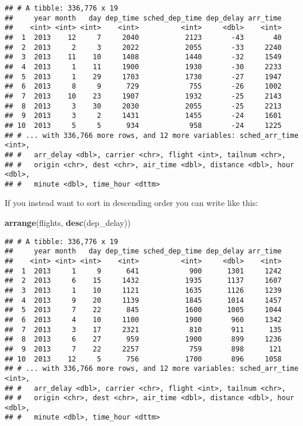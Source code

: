 \documentclass[]{book}
\newenvironment{Shaded}{\begin{snugshade}}{\end{snugshade}}
\newcommand{\KeywordTok}[1]{\textcolor[rgb]{0.13,0.29,0.53}{\textbf{#1}}}
\newcommand{\NormalTok}[1]{#1}
\begin{document}
\begin{verbatim}
## # A tibble: 336,776 x 19
##     year month   day dep_time sched_dep_time dep_delay arr_time
##    <int> <int> <int>    <int>          <int>     <dbl>    <int>
##  1  2013    12     7     2040           2123       -43       40
##  2  2013     2     3     2022           2055       -33     2240
##  3  2013    11    10     1408           1440       -32     1549
##  4  2013     1    11     1900           1930       -30     2233
##  5  2013     1    29     1703           1730       -27     1947
##  6  2013     8     9      729            755       -26     1002
##  7  2013    10    23     1907           1932       -25     2143
##  8  2013     3    30     2030           2055       -25     2213
##  9  2013     3     2     1431           1455       -24     1601
## 10  2013     5     5      934            958       -24     1225
## # ... with 336,766 more rows, and 12 more variables: sched_arr_time <int>,
## #   arr_delay <dbl>, carrier <chr>, flight <int>, tailnum <chr>,
## #   origin <chr>, dest <chr>, air_time <dbl>, distance <dbl>, hour <dbl>,
## #   minute <dbl>, time_hour <dttm>
\end{verbatim}

If you instead want to sort in descending order you can write like this:

\begin{Shaded}
\begin{Highlighting}[]
\KeywordTok{arrange}\NormalTok{(flights, }\KeywordTok{desc}\NormalTok{(dep_delay))}
\end{Highlighting}
\end{Shaded}

\begin{verbatim}
## # A tibble: 336,776 x 19
##     year month   day dep_time sched_dep_time dep_delay arr_time
##    <int> <int> <int>    <int>          <int>     <dbl>    <int>
##  1  2013     1     9      641            900      1301     1242
##  2  2013     6    15     1432           1935      1137     1607
##  3  2013     1    10     1121           1635      1126     1239
##  4  2013     9    20     1139           1845      1014     1457
##  5  2013     7    22      845           1600      1005     1044
##  6  2013     4    10     1100           1900       960     1342
##  7  2013     3    17     2321            810       911      135
##  8  2013     6    27      959           1900       899     1236
##  9  2013     7    22     2257            759       898      121
## 10  2013    12     5      756           1700       896     1058
## # ... with 336,766 more rows, and 12 more variables: sched_arr_time <int>,
## #   arr_delay <dbl>, carrier <chr>, flight <int>, tailnum <chr>,
## #   origin <chr>, dest <chr>, air_time <dbl>, distance <dbl>, hour <dbl>,
## #   minute <dbl>, time_hour <dttm>
\end{verbatim}
\end{document}
